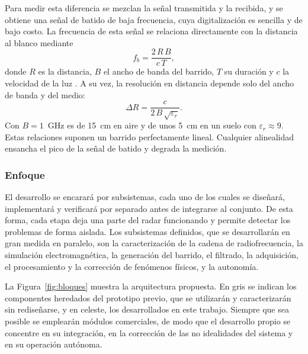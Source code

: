 \documentclass[11pt, a4paper, oneside]{article}
\begin{document}
Para medir esta diferencia se mezclan la señal transmitida y la
recibida, y se obtiene una señal de batido de baja frecuencia, cuya
digitalización es sencilla y de bajo costo. La frecuencia de esta señal
se relaciona directamente con la distancia al blanco mediante
\begin{equation}
  f_b = \frac{2\,R\,B}{c\,T},
  \label{eq:fb}
\end{equation}
donde $R$ es la distancia, $B$ el ancho de banda del barrido, $T$ su
duración y $c$ la velocidad de la luz \cite{Stove1992}. A su vez, la
resolución en distancia depende solo del ancho de banda y del medio:
\begin{equation}
  \Delta R = \frac{c}{2\,B\,\sqrt{\varepsilon_r}}.
  \label{eq:resolucion}
\end{equation}
Con $B = 1$~GHz es de 15~cm en aire y de unos 5~cm en un suelo con
$\varepsilon_r \approx 9$. Estas relaciones suponen un barrido
perfectamente lineal. Cualquier alinealidad ensancha el pico de la
señal de batido y degrada la medición.

\subsubsection{Enfoque}

El desarrollo se encarará por subsistemas, cada uno de los cuales se
diseñará, implementará y verificará por separado antes de integrarse
al conjunto. De esta forma, cada etapa deja una parte del radar
funcionando y permite detectar los problemas de forma aislada. Los
subsistemas definidos, que se desarrollarán en gran medida en
paralelo, son la caracterización de la cadena de radiofrecuencia, la
simulación electromagnética, la generación del barrido, el filtrado,
la adquisición, el procesamiento y la corrección de fenómenos físicos,
y la autonomía.

La Figura~\ref{fig:bloques} muestra la arquitectura propuesta. En gris
se indican los componentes heredados del prototipo previo, que se
utilizarán y caracterizarán sin rediseñarse, y en celeste, los
desarrollados en este trabajo. Siempre que sea posible se emplearán
módulos comerciales, de modo que el desarrollo propio se concentre en
su integración, en la corrección de las no idealidades del sistema y en
su operación autónoma.
\end{document}
